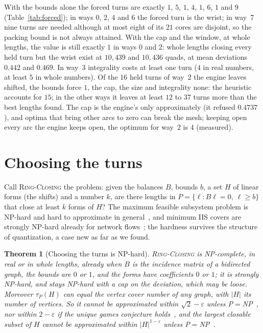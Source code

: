\documentclass[11pt,a4paper]{article}
\newtheorem{theorem}{Theorem}
\newcommand{\RC}{\textup{\textsc{Ring-Closing}}}
\begin{document}
With the bounds alone the forced turns are exactly $1$, $5$, $1$, $4$, $1$,
$6$, $1$ and $9$ (Table~\ref{tab:forced}); in ways 0, 2, 4 and 6 the forced
turn is the wrist; in way~7 nine turns are needed although at most
eight of its $21$ cores are disjoint, so the packing bound is not always
attained. With the cap and the window, at whole lengths, the value is still
exactly $1$ in ways 0 and 2: whole lengths closing every held turn but the
wrist exist at $10{,}439$ and $10{,}436$ quads, at mean deviations $0.442$ and
$0.469$. In way~3 integrality
costs at least one turn ($4$ in real numbers, at least $5$ in whole numbers). Of the
$16$ held turns of way~2 the engine leaves shifted, the bounds force $1$, the
cap, the size and integrality none: the heuristic accounts for $15$; in the
other ways it leaves at least $12$ to $37$ turns more than the best lengths
found. The cap is the engine's only approximately (it refused $0.4737$), and optima
that bring other arcs to zero can break the mesh; keeping open every arc the
engine keeps open, the optimum for way~2 is $4$ (measured).

\section{Choosing the turns}\label{sec:choosing}

Call \RC{} the problem: given the balances $B$, bounds $b$, a set $H$ of
linear forms (the shifts) and a number $k$, are there lengths in $P = \{\ell :
B\ell = 0,\ \ell \ge b\}$ that close at least $k$ forms of $H$? The maximum
feasible subsystem problem is NP-hard and hard to approximate in
general~\cite{amaldi1995complexity}, and minimum IIS covers are strongly
NP-hard already for network flows~\cite{joormann2015flowiis}; the hardness
survives the structure of quantization, a case new as far as we found.

\begin{theorem}[Choosing the turns is NP-hard]\label{thm:nphard}
\RC{} is NP-complete, in real or in whole lengths, already when $B$ is the
incidence matrix of a bidirected graph, the bounds are $0$ or $1$, and the
forms have coefficients $0$ or $1$; it is strongly NP-hard, and stays NP-hard
with a cap on the deviation, which may be loose. Moreover $\tau_P(H)$ can
equal the vertex cover number of any graph, with $|H|$ its number of vertices.
So it cannot be approximated within $\sqrt2 - \varepsilon$ unless
P${}={}$NP~\cite{khot2017independent,dinur2018towards,dinur2018nonoptimally,khot2018grassmann},
nor within $2 - \varepsilon$ if the unique games conjecture
holds~\cite{khot2008vertex}, and the largest closable subset of $H$ cannot be
approximated within $|H|^{1-\varepsilon}$ unless
P${}={}$NP~\cite{hastad1999clique,zuckerman2007linear}.
\end{theorem}
\end{document}
